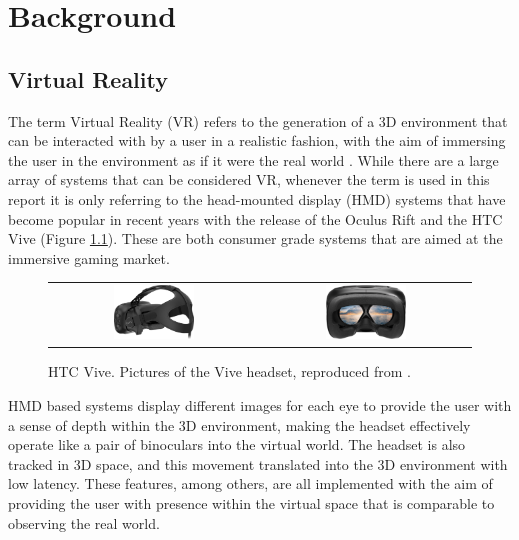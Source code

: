 \chapter{Background}

\section{Virtual Reality}

The term Virtual Reality (VR) refers to the generation of a 3D environment that can be interacted with by a user in a realistic fashion, with the aim of immersing the user in the environment as if it were the real world \cite{WhatVR}. While there are a large array of systems that can be considered VR, whenever the term is used in this report it is only referring to the head-mounted display (HMD) systems that have become popular in recent years with the release of the Oculus Rift \cite{Oculus} and the HTC Vive \cite{Vive} (Figure \ref{fig:Vive}). These are both consumer grade systems that are aimed at the immersive gaming market.

\begin{figure}[H]
    \begin{center}
    \begin{tabular}{ c c }
        \includegraphics[width=0.4\textwidth]{Figures/vive.png} &
        \includegraphics[width=0.4\textwidth]{Figures/vive2.png}
    \end{tabular}
    \caption[HTC Vive]{HTC Vive. Pictures of the Vive headset, reproduced from \cite{Vive}.}
    \label{fig:Vive}
    \end{center}
\end{figure}

HMD based systems display different images for each eye to provide the user with a sense of depth within the 3D environment, making the headset effectively operate like a pair of binoculars into the virtual world. The headset is also tracked in 3D space, and this movement translated into the 3D environment with low latency. These features, among others, are all implemented with the aim of providing the user with presence within the virtual space that is comparable to observing the real world.

